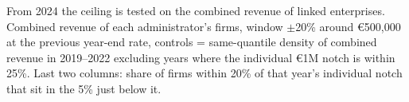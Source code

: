 \begin{landscape}
\begin{table}[!tbp]\centering
\footnotesize
\caption{Bunching of combined revenue of firms sharing an administrator, and firm-level bunching inside groups}\label{tab:groups}
\begin{minipage}{0.95\linewidth}\vspace{2pt}\footnotesize From 2024 the ceiling is tested on the combined revenue of linked enterprises. Combined revenue of each administrator's firms, window $\pm$20\% around \euro{}500,000 at the previous year-end rate, controls = same-quantile density of combined revenue in 2019--2022 excluding years where the individual \euro{}1M notch is within 25\%. Last two columns: share of firms within 20\% of that year's individual notch that sit in the 5\% just below it.\end{minipage}
\end{table}
\end{landscape}